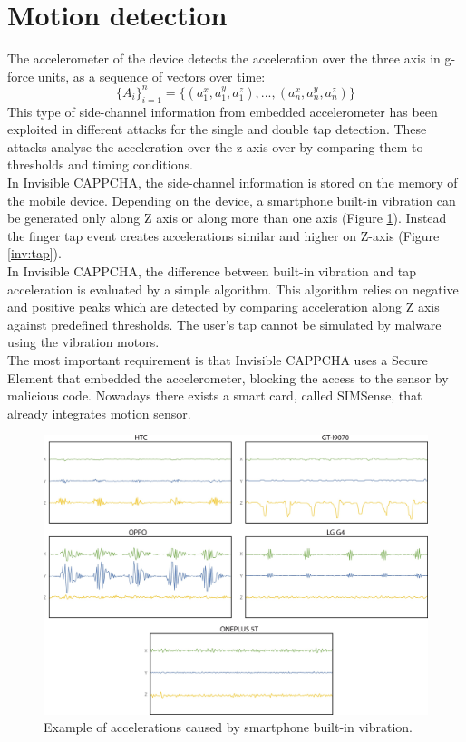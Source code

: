 \section{Motion detection}
The accelerometer of the device detects the acceleration over the three axis in g-force units, as a sequence of vectors over time:
$$\{ A_i\}_{i=1}^{n} = \{ (a_1^x, a_1^y, a_1^z), ..., (a_n^x, a_n^y, a_n^z)\}$$
This type of side-channel information from embedded accelerometer has been exploited in different attacks for the single and double tap detection. These attacks analyse the acceleration over the z-axis over by comparing them to thresholds and timing conditions.\\
In Invisible CAPPCHA, the side-channel information is stored on the memory of the mobile device. Depending on the device, a smartphone built-in vibration can be generated only along Z axis or along more than one axis (Figure \ref{inv:vibration}). Instead the finger tap event creates accelerations similar and higher on Z-axis (Figure \ref{inv:tap}).\\
In Invisible CAPPCHA, the difference between built-in vibration and tap acceleration is evaluated by a simple algorithm. This algorithm relies on negative and positive peaks which are detected by comparing acceleration along Z axis against predefined thresholds. The user’s tap cannot be simulated by malware using the vibration motors.\\
The most important requirement is that Invisible CAPPCHA uses a Secure Element that embedded the accelerometer, blocking the access to the sensor by malicious code. Nowadays there exists a smart card, called SIMSense, that already integrates motion sensor.\\
\begin{figure}[h]
     \centering
     \includegraphics[width=.8\linewidth]{Images/InvisibleCAPPCHA/vibration}
     \caption{\footnotesize{Example of accelerations caused by smartphone built-in vibration.}}\label{inv:vibration}
\end{figure}
